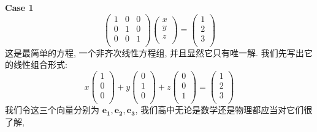 \documentclass[UTF8]{book}
\begin{document}
    \noindent \textbf{Case 1}
    \begin{equation}
    \begin{pmatrix}
        1 & 0 & 0 \\
        0 & 1 & 0 \\
        0 & 0 & 1 \\
    \end{pmatrix}
    \begin{pmatrix}
        x \\
        y \\
        z \\
    \end{pmatrix}
    =
    \begin{pmatrix}
        1 \\
        2 \\
        3 \\
    \end{pmatrix}
    \end{equation}
    这是最简单的方程, 一个非齐次线性方程组, 并且显然它只有唯一解. 
    我们先写出它的线性组合形式: 
    \begin{equation}
        x
        \begin{pmatrix}
            1 \\
            0 \\
            0 \\
        \end{pmatrix}
        +
        y
        \begin{pmatrix}
            0 \\
            1 \\
            0 \\
        \end{pmatrix}
        +
        z
        \begin{pmatrix}
            0 \\
            0 \\
            1 \\
        \end{pmatrix}
        =
        \begin{pmatrix}
            1 \\
            2 \\
            3 \\
        \end{pmatrix}
    \end{equation}
    我们令这三个向量分别为 $\boldsymbol{e_1},\boldsymbol{e_2},\boldsymbol{e_3}$, 
    我们高中无论是数学还是物理都应当对它们很了解, 
\end{document}
